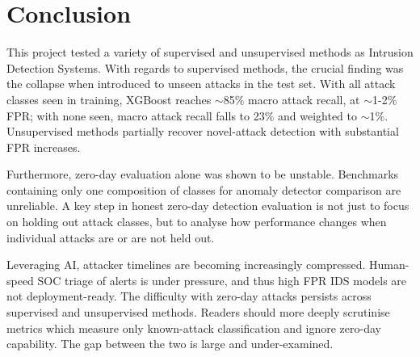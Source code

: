 \documentclass{article}
\begin{document}
\section{Conclusion}
This project tested a variety of supervised and unsupervised methods as Intrusion Detection Systems. With regards to supervised methods, the crucial finding was the collapse when introduced to unseen attacks in the test set. With all attack classes seen in training, XGBoost reaches $\sim$85\% macro attack recall, at $\sim$1-2\% FPR; with none seen, macro attack recall falls to 23\% and weighted to $\sim$1\%. Unsupervised methods partially recover novel-attack detection with substantial FPR increases. 
\par Furthermore, zero-day evaluation alone was shown to be unstable. Benchmarks containing only one composition of classes for anomaly detector comparison are unreliable. A key step in honest zero-day detection evaluation is not just to focus on holding out attack classes, but to analyse how performance changes when individual attacks are or are not held out.
\par Leveraging AI, attacker timelines are becoming increasingly compressed\parencite{mandiant_mtrends2026}. Human-speed SOC triage of alerts is under pressure, and thus high FPR IDS models are not deployment-ready. The difficulty with zero-day attacks persists across supervised and unsupervised methods. Readers should more deeply scrutinise metrics which measure only known-attack classification and ignore zero-day capability. The gap between the two is large and under-examined. 
\begin{table}[H]
\end{table}
\end{document}
